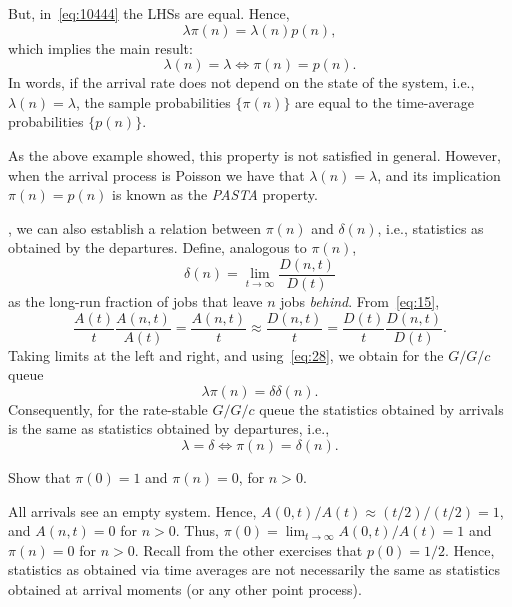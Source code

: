 But, in~\cref{eq:10444} the LHSs are equal. Hence,
\begin{equation}\label{eq:13}
\lambda \pi(n) = \lambda(n) p(n),
\end{equation}
which implies the main result:
\begin{equation*}
 \lambda(n) = \lambda \iff \pi(n) = p(n).
\end{equation*}
In words,  if the arrival rate does not depend on the state of the system, i.e., $\lambda(n)=\lambda$, the sample probabilities $\{\pi(n)\}$ are equal to the time-average probabilities $\{p(n)\}$.

As the above example showed, this property is not satisfied in general.
However, when the arrival process is Poisson we have that $\lambda(n)=\lambda$, and its implication $\pi(n)=p(n)$ is known as the \emph{PASTA} property.


, we can also establish a relation between $\pi(n)$ and $\delta(n)$, i.e.,  statistics as obtained by the departures.
Define, analogous to $\pi(n)$,
\begin{equation*}
 \delta(n) = \lim_{t\to\infty} \frac{D(n,t)}{D(t)}
\end{equation*}
as the long-run fraction of jobs that leave $n$ jobs \emph{behind}.
From~\cref{eq:15},
\begin{equation*}
\frac{A(t)}t \frac{A(n,t)}{A(t)} = \frac{A(n,t)}t \approx \frac{D(n,t)}t
= \frac{D(t)}t \frac{D(n,t)}{D(t)}.
\end{equation*}
Taking limits at the left and right, and using~\cref{eq:28}, we obtain for the $G/G/c$ queue
\begin{equation} \label{eq:36}
 \lambda \pi(n) = \delta \delta(n).
\end{equation}
Consequently, for the  rate-stable $G/G/c$ queue  the statistics obtained by arrivals is the same as statistics obtained by departures, i.e.,
\begin{equation} \label{eq:39}
\lambda = \delta \iff \pi(n) = \delta(n).
\end{equation}

\begin{exercise}\label{ex:8}
Show that $\pi(0)=1$ and $\pi(n)=0$, for $n>0$.
\begin{solution}
  All arrivals see an empty system.
  Hence, $A(0,t)/A(t) \approx (t/2)/(t/2) = 1$, and $A(n,t)=0$ for $n>0$.
  Thus, $\pi(0) = \lim_{t\to\infty} A(0,t)/A(t) = 1$ and $\pi(n)=0$ for $n>0$.
  Recall from the other exercises that $p(0)=1/2$.
  Hence, statistics as obtained via time averages are not necessarily the same as statistics obtained at arrival moments (or any other point process).
\end{solution}

\end{exercise}

